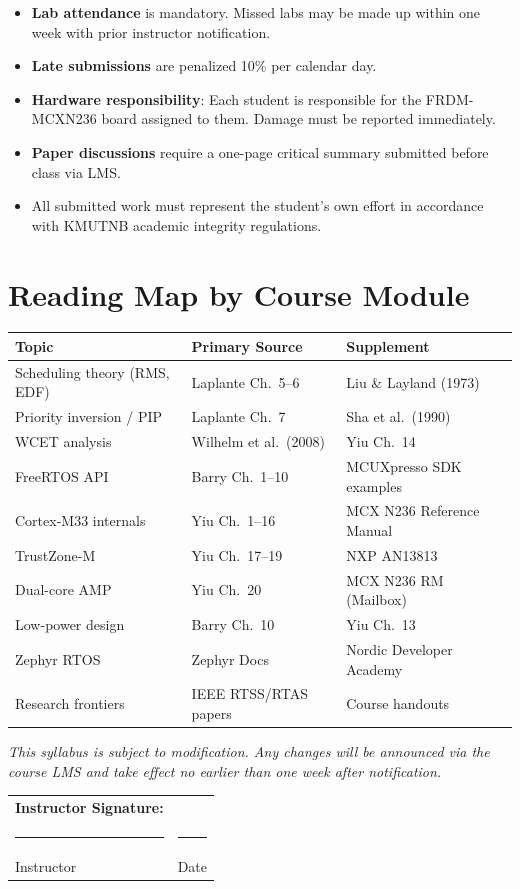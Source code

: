 \documentclass[12pt, a4paper]{article}
\begin{document}
\begin{itemize}[noitemsep]
  \item \textbf{Lab attendance} is mandatory. Missed labs may be made up within one
        week with prior instructor notification.
  \item \textbf{Late submissions} are penalized 10\% per calendar day.
  \item \textbf{Hardware responsibility}: Each student is responsible for the
        FRDM-MCXN236 board assigned to them. Damage must be reported immediately.
  \item \textbf{Paper discussions} require a one-page critical summary submitted
        before class via LMS.
  \item All submitted work must represent the student's own effort in accordance with
        KMUTNB academic integrity regulations.
\end{itemize}

\section{Reading Map by Course Module}

\begin{tabular}{@{}p{4.5cm} p{3.5cm} p{5.5cm}@{}}
  \toprule
  \textbf{Topic} & \textbf{Primary Source} & \textbf{Supplement} \\
  \midrule
  Scheduling theory (RMS, EDF) & Laplante Ch.\ 5--6 & Liu \& Layland (1973) \\
  Priority inversion / PIP & Laplante Ch.\ 7 & Sha et al.\ (1990) \\
  WCET analysis & Wilhelm et al.\ (2008) & Yiu Ch.\ 14 \\
  FreeRTOS API & Barry Ch.\ 1--10 & MCUXpresso SDK examples \\
  Cortex-M33 internals & Yiu Ch.\ 1--16 & MCX N236 Reference Manual \\
  TrustZone-M & Yiu Ch.\ 17--19 & NXP AN13813 \\
  Dual-core AMP & Yiu Ch.\ 20 & MCX N236 RM (Mailbox) \\
  Low-power design & Barry Ch.\ 10 & Yiu Ch.\ 13 \\
  Zephyr RTOS & Zephyr Docs & Nordic Developer Academy \\
  Research frontiers & IEEE RTSS/RTAS papers & Course handouts \\
  \bottomrule
\end{tabular}

\vspace{1cm}
\noindent\textit{This syllabus is subject to modification. Any changes will be
announced via the course LMS and take effect no earlier than one week after
notification.}

\vspace{0.8cm}
\noindent\begin{tabular}{@{}p{6cm} p{6cm}@{}}
  \textbf{Instructor Signature:} & \\[1.5cm]
  \rule{5.5cm}{0.4pt} & \rule{4cm}{0.4pt} \\
  Instructor & Date \\
\end{tabular}
\end{document}
